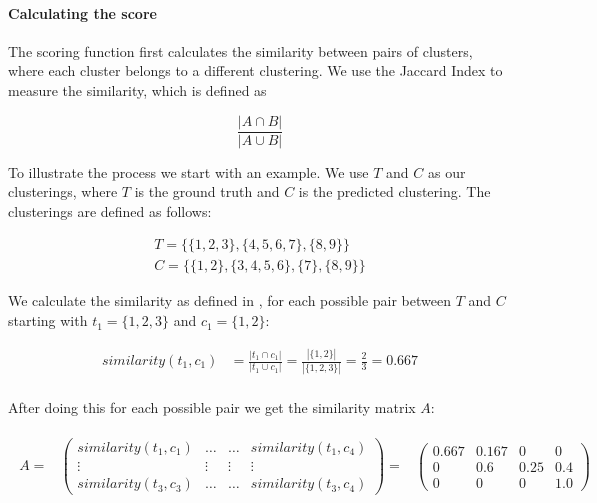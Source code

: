 \paragraph{Calculating the score}
The scoring function first calculates the similarity between pairs of clusters,
where each cluster belongs to a different clustering.
We use the Jaccard Index to measure the similarity, which is defined as

\begin{equation}
    \label{equ:similarity}
    \frac{|A \cap B|}{|A \cup B|}
\end{equation}

To illustrate the process we start with an example.
We use $T$ and $C$ as our clusterings, where $T$ is the ground truth and $C$ is the predicted clustering.
The clusterings are defined as follows:

\begin{gather*}
    T = \{\{1,2,3\},\{4,5,6,7\},\{8,9\}\} \\
    C = \{\{1,2\},\{3,4,5,6\},\{7\},\{8,9\}\}
\end{gather*}

We calculate the similarity as defined in ,
for each possible pair between $T$ and $C$ starting with $t_1= \{1,2,3\}$ and $c_1 = \{1,2\}$:

\begin{align*}
    similarity(t_1,c_1) &=\frac{|t_1 \cap c_1|}{|t_1 \cup c_1|}
    = \frac{|\{1,2\}|}{|\{1,2,3\}|}
    = \frac{2}{3} = 0.667 \\
\end{align*}

After doing this for each possible pair we get the similarity matrix $A$:

\begin{gather*}
\begin{array}{rcl}
    A = & \left(\begin{array}{cccc}
        similarity(t_1,c_1) & \hdots & \hdots & similarity(t_1,c_4)\\
        \vdots & \vdots & \vdots & \vdots\\
        similarity(t_3,c_3) & \hdots & \hdots & similarity(t_3,c_4) \end{array}\right)
        = & \left(\begin{array}{cccc}
            0.667 & 0.167 & 0 & 0 \\
            0 & 0.6 & 0.25 & 0.4 \\
            0 &  0 & 0 & 1.0 \end{array}\right)
\end{array}
\end{gather*}

